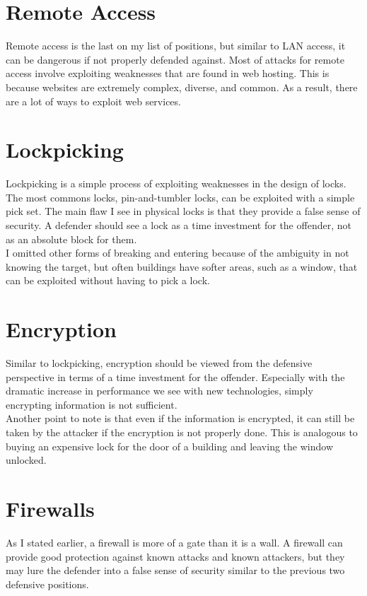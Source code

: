 \documentclass{article}
\begin{document}
\section{Remote Access}
Remote access is the last on my list of positions, but similar to LAN access, it can be dangerous if not properly defended against. Most of attacks for remote access involve exploiting weaknesses that are found in web hosting. This is because websites are extremely complex, diverse, and common. As a result, there are a lot of ways to exploit web services.\\


\section{Lockpicking}
Lockpicking is a simple process of exploiting weaknesses in the design of locks. The most commons locks, pin-and-tumbler locks, can be exploited with a simple pick set. The main flaw I see in physical locks is that they provide a false sense of security. A defender should see a lock as a time investment for the offender, not as an absolute block for them.\\
I omitted other forms of breaking and entering because of the ambiguity in not knowing the target, but often buildings have softer areas, such as a window, that can be exploited without having to pick a lock.\\

\section{Encryption}
Similar to lockpicking, encryption should be viewed from the defensive perspective in terms of a time investment for the offender. Especially with the dramatic increase in performance we see with new technologies, simply encrypting information is not sufficient.\\
Another point to note is that even if the information is encrypted, it can still be taken by the attacker if the encryption is not properly done. This is analogous to buying an expensive lock for the door of a building and leaving the window unlocked.\\

\section{Firewalls}
As I stated earlier, a firewall is more of a gate than it is a wall. A firewall can provide good protection against known attacks and known attackers, but they may lure the defender into a false sense of security similar to the previous two defensive positions. 
\end{document}
